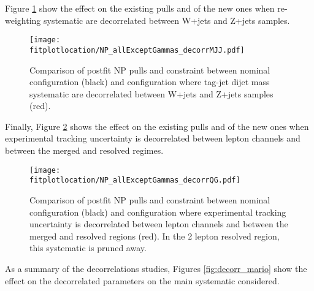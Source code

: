 \clearpage
Figure \ref{fig:NPDecorrMJJ} show the effect on the existing pulls and of the new ones 
when \mjjtag re-weighting systematic are decorrelated between W+jets and Z+jets samples.
\begin{figure}[h]
  \centering
  \texttt{[image: \\fitplotlocation/NP\_allExceptGammas\_decorrMJJ.pdf]}
        \caption{Comparison of postfit NP pulls and constraint between nominal configuration (black) and configuration where tag-jet dijet mass systematic are decorrelated between W+jets and Z+jets samples (red).}
  \label{fig:NPDecorrMJJ}
\end{figure}

\clearpage
Finally, Figure \ref{fig:NPDecorrQG} shows the effect on the existing pulls and of the new ones 
when experimental tracking uncertainty is decorrelated 
between lepton channels and between the merged and resolved regimes.

\begin{figure}[h]
  \centering
  \texttt{[image: \\fitplotlocation/NP\_allExceptGammas\_decorrQG.pdf]}
	\caption{Comparison of postfit NP pulls and constraint between nominal configuration (black) and configuration where experimental tracking uncertainty is decorrelated between lepton channels and between the merged and resolved regions (red). In the 2 lepton resolved region, this systematic is pruned away. }
  \label{fig:NPDecorrQG}
\end{figure}

As a summary of the decorrelations studies, Figures \ref{fig:decorr_mario}
show the effect on the decorrelated parameters on the main systematic considered.

